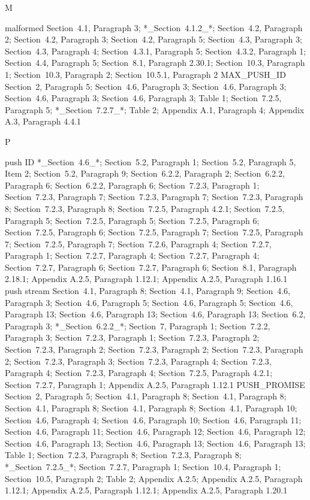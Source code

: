 \documentclass{article}
\begin{document}
M

malformed  Section~4.1, Paragraph 3; *\_Section~4.1.2\_*; Section~4.2, Paragraph 2; Section~4.2, Paragraph 3; Section~4.2, Paragraph 5; Section~4.3, Paragraph 3; Section~4.3, Paragraph 4; Section~4.3.1, Paragraph 5; Section~4.3.2, Paragraph 1; Section~4.4, Paragraph 5; Section~8.1, Paragraph 2.30.1; Section~10.3, Paragraph 1; Section~10.3, Paragraph 2; Section~10.5.1, Paragraph 2 MAX\_PUSH\_ID  Section~2, Paragraph 5; Section~4.6, Paragraph 3; Section~4.6, Paragraph 3; Section~4.6, Paragraph 3; Section~4.6, Paragraph 3; Table 1; Section~7.2.5, Paragraph 5; *\_Section~7.2.7\_*; Table 2; Appendix A.1, Paragraph 4; Appendix A.3, Paragraph 4.4.1

P

push ID  *\_Section~4.6\_*; Section~5.2, Paragraph 1; Section~5.2, Paragraph 5, Item 2; Section~5.2, Paragraph 9; Section~6.2.2, Paragraph 2; Section~6.2.2, Paragraph 6; Section~6.2.2, Paragraph 6; Section~7.2.3, Paragraph 1; Section~7.2.3, Paragraph 7; Section~7.2.3, Paragraph 7; Section~7.2.3, Paragraph 8; Section~7.2.3, Paragraph 8; Section~7.2.5, Paragraph 4.2.1; Section~7.2.5, Paragraph 5; Section~7.2.5, Paragraph 5; Section~7.2.5, Paragraph 6; Section~7.2.5, Paragraph 6; Section~7.2.5, Paragraph 7; Section~7.2.5, Paragraph 7; Section~7.2.5, Paragraph 7; Section~7.2.6, Paragraph 4; Section~7.2.7, Paragraph 1; Section~7.2.7, Paragraph 4; Section~7.2.7, Paragraph 4; Section~7.2.7, Paragraph 6; Section~7.2.7, Paragraph 6; Section~8.1, Paragraph 2.18.1; Appendix A.2.5, Paragraph 1.12.1; Appendix A.2.5, Paragraph 1.16.1 push stream  Section~4.1, Paragraph 8; Section~4.1, Paragraph 9; Section~4.6, Paragraph 3; Section~4.6, Paragraph 5; Section~4.6, Paragraph 5; Section~4.6, Paragraph 13; Section~4.6, Paragraph 13; Section~4.6, Paragraph 13; Section~6.2, Paragraph 3; *\_Section~6.2.2\_*; Section~7, Paragraph 1; Section~7.2.2, Paragraph 3; Section~7.2.3, Paragraph 1; Section~7.2.3, Paragraph 2; Section~7.2.3, Paragraph 2; Section~7.2.3, Paragraph 2; Section~7.2.3, Paragraph 2; Section~7.2.3, Paragraph 3; Section~7.2.3, Paragraph 4; Section~7.2.3, Paragraph 4; Section~7.2.3, Paragraph 4; Section~7.2.5, Paragraph 4.2.1; Section~7.2.7, Paragraph 1; Appendix A.2.5, Paragraph 1.12.1 PUSH\_PROMISE  Section~2, Paragraph 5; Section~4.1, Paragraph 8; Section~4.1, Paragraph 8; Section~4.1, Paragraph 8; Section~4.1, Paragraph 8; Section~4.1, Paragraph 10; Section~4.6, Paragraph 4; Section~4.6, Paragraph 10; Section~4.6, Paragraph 11; Section~4.6, Paragraph 11; Section~4.6, Paragraph 12; Section~4.6, Paragraph 12; Section~4.6, Paragraph 13; Section~4.6, Paragraph 13; Section~4.6, Paragraph 13; Table 1; Section~7.2.3, Paragraph 8; Section~7.2.3, Paragraph 8; *\_Section~7.2.5\_*; Section~7.2.7, Paragraph 1; Section~10.4, Paragraph 1; Section~10.5, Paragraph 2; Table 2; Appendix A.2.5; Appendix A.2.5, Paragraph 1.12.1; Appendix A.2.5, Paragraph 1.12.1; Appendix A.2.5, Paragraph 1.20.1
\end{document}
